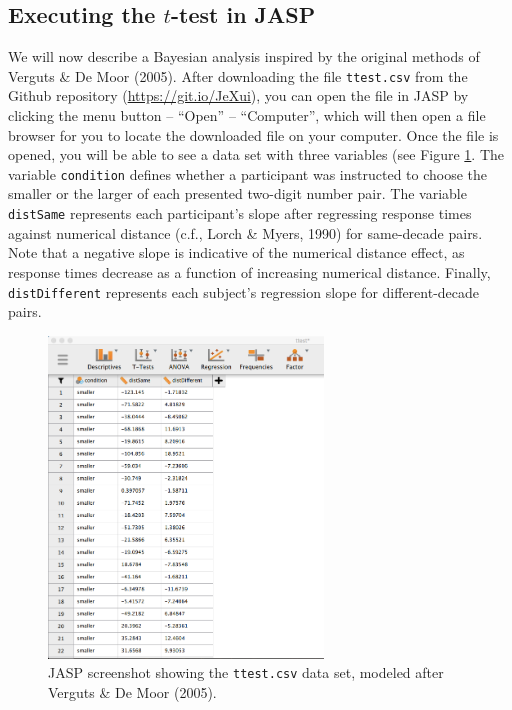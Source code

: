 \documentclass[english,,doc,floatsintext]{apa6}
\begin{document}
\hypertarget{executing-the-t-test-in-jasp}{%
\subsection{\texorpdfstring{Executing the \(t\)-test in JASP}{Executing the t-test in JASP}}\label{executing-the-t-test-in-jasp}}

We will now describe a Bayesian analysis inspired by the original methods of Verguts \& De Moor (2005). After downloading the file \texttt{ttest.csv} from the Github repository (\url{https://git.io/JeXui}), you can open the file in JASP by clicking the menu button -- \enquote{Open} -- \enquote{Computer}, which will then open a file browser for you to locate the downloaded file on your computer. Once the file is opened, you will be able to see a data set with three variables (see Figure \ref{fig:ttestData}. The variable \texttt{condition} defines whether a participant was instructed to choose the smaller or the larger of each presented two-digit number pair. The variable \texttt{distSame} represents each participant's slope after regressing response times against numerical distance (c.f., Lorch \& Myers, 1990) for same-decade pairs. Note that a negative slope is indicative of the numerical distance effect, as response times decrease as a function of increasing numerical distance. Finally, \texttt{distDifferent} represents each subject's regression slope for different-decade pairs.

\begin{figure}
\centering
\includegraphics[width=0.65\textwidth,height=\textheight]{figures/ttestData.png}
\caption{\label{fig:ttestData}JASP screenshot showing the \texttt{ttest.csv} data set, modeled after Verguts \& De Moor (2005).}
\end{figure}
\end{document}
